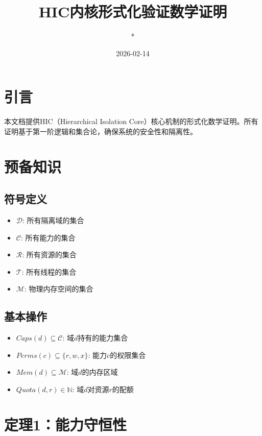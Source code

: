 \documentclass{article}
\title{HIC内核形式化验证数学证明}
\author{*}
\date{2026-02-14}
\theoremstyle{definition}
\theoremstyle{remark}
\begin{document}
\maketitle

\section{引言}

本文档提供HIC（Hierarchical Isolation Core）核心机制的形式化数学证明。所有证明基于第一阶逻辑和集合论，确保系统的安全性和隔离性。

\section{预备知识}

\subsection{符号定义}

\begin{itemize}
    \item $\mathcal{D}$: 所有隔离域的集合
    \item $\mathcal{C}$: 所有能力的集合
    \item $\mathcal{R}$: 所有资源的集合
    \item $\mathcal{T}$: 所有线程的集合
    \item $\mathcal{M}$: 物理内存空间的集合
\end{itemize}

\subsection{基本操作}

\begin{itemize}
    \item $Caps(d) \subseteq \mathcal{C}$: 域$d$持有的能力集合
    \item $Perms(c) \subseteq \{r, w, x\}$: 能力$c$的权限集合
    \item $Mem(d) \subseteq \mathcal{M}$: 域$d$的内存区域
    \item $Quota(d, r) \in \mathbb{N}$: 域$d$对资源$r$的配额
\end{itemize}

\section{定理1：能力守恒性}
\end{document}
